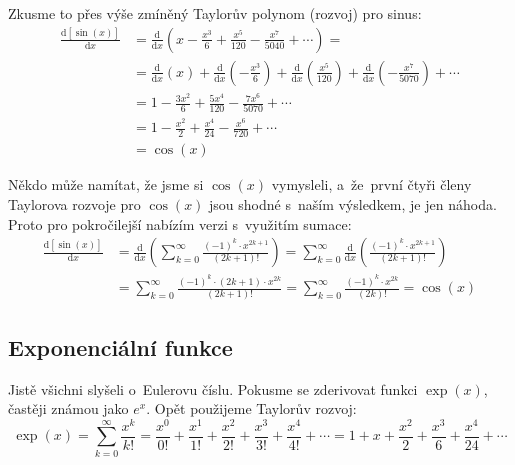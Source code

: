 Zkusme to přes výše zmíněný Taylorův polynom (rozvoj) pro sinus:
\begin{align*}
    \frac{\text{d}[\sin(x)]}{\text{d}x}
    &= \frac{\text{d}}{\text{d}x} \left(x - \frac{x^3}{6} + \frac{x^5}{120} - \frac{x^7}{5040} + \cdots \right) = \\
    &= \frac{\text{d}}{\text{d}x} (x)
    + \frac{\text{d}}{\text{d}x} \left(-\frac{x^3}{6}\right)
    + \frac{\text{d}}{\text{d}x} \left(\frac{x^5}{120}\right)
    + \frac{\text{d}}{\text{d}x} \left(-\frac{x^7}{5070}\right)
    + \cdots \\
    &= 1 - \frac{3x^2}{6} + \frac{5x^4}{120} - \frac{7x^6}{5070} + \cdots \\
    &= 1 - \frac{x^2}{2} + \frac{x^4}{24} - \frac{x^6}{720} + \cdots \\
    &= \cos(x)
\end{align*}

Někdo může namítat, že jsme si $\cos(x)$ vymysleli, a~že~první čtyři členy Taylorova rozvoje pro $\cos(x)$ jsou shodné s~naším výsledkem, je jen náhoda. Proto pro pokročilejší nabízím verzi s~využitím sumace:
\begin{align*}
    \frac{\text{d}[\sin(x)]}{\text{d}x}
    &= \frac{\text{d}}{\text{d}x} \left( \sum_{k=0}^{\infty} \frac{(-1)^k \cdot x^{2k + 1}}{(2k + 1)!} \right)
    = \sum_{k=0}^{\infty} \frac{\text{d}}{\text{d}x} \left( \frac{(-1)^k \cdot x^{2k + 1}}{(2k + 1)!} \right) \\
    &= \sum_{k=0}^{\infty} \frac{(-1)^k \cdot (2k+1) \cdot  x^{2k}}{(2k+1)!}
    = \sum_{k=0}^{\infty} \frac{(-1)^k \cdot  x^{2k}}{(2k)!}
    = \cos(x)
\end{align*}

\subsection{Exponenciální funkce}

Jistě všichni slyšeli o~Eulerovu číslu. Pokusme se zderivovat funkci $\exp(x)$, častěji známou jako $e^x$. Opět použijeme Taylorův rozvoj:
\begin{equation*}
    \exp(x) = \sum_{k=0}^{\infty} \frac{x^k}{k!}
    = \frac{x^0}{0!} + \frac{x^1}{1!} + \frac{x^2}{2!} + \frac{x^3}{3!} + \frac{x^4}{4!} + \cdots
    = 1 + x + \frac{x^2}{2} + \frac{x^3}{6} + \frac{x^4}{24} + \cdots
\end{equation*}